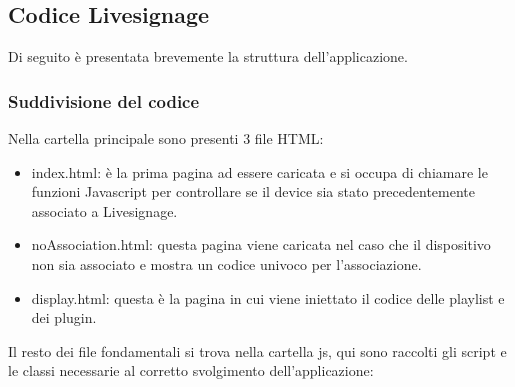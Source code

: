 \subsection{Codice Livesignage}

Di seguito è presentata brevemente la struttura dell'applicazione.

\subsubsection{Suddivisione del codice}

Nella cartella principale sono presenti 3 file HTML: 
\begin{itemize}
    \item index.html: è la prima pagina ad essere caricata e si occupa di chiamare le funzioni Javascript per controllare se il device sia stato precedentemente associato a Livesignage.
    \item noAssociation.html: questa pagina viene caricata nel caso che il dispositivo non sia associato e mostra un codice univoco per l'associazione.
    \item display.html: questa è la pagina in cui viene iniettato il codice delle playlist e dei plugin.
\end{itemize}

Il resto dei file fondamentali si trova nella cartella js, qui sono raccolti gli script e le classi necessarie al corretto svolgimento dell'applicazione:

